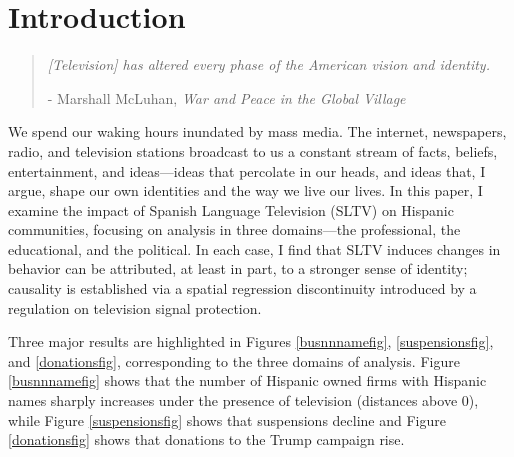 \documentclass[11pt]{article}
\begin{document}
\newsavebox{\tablebox} \newlength{\tableboxwidth}

\setlength{\baselineskip}{22pt}

\renewcommand{\thefootnote}{\fnsymbol{footnote}}


\thispagestyle{empty}

\newpage 
\renewcommand{\thefootnote}{\arabic{footnote}}

\pagebreak 
\setcounter{page}{0}


\onehalfspacing


\newpage

\setcounter{page}{1}
\section{Introduction}

\begin{quotation}
\textit{[Television] has altered every phase of the American vision and identity. }
\begin{flushright} - Marshall McLuhan, \textit{War and Peace in the Global Village}\end{flushright}
\end{quotation}

We spend our waking hours inundated by mass media. The internet, newspapers, radio, and television stations broadcast to us a constant stream of facts, beliefs, entertainment, and ideas---ideas that percolate in our heads, and ideas that, I argue, shape our own identities and the way we live our lives. In this paper, I examine the impact of Spanish Language Television (SLTV) on Hispanic communities, focusing on analysis in three domains---the professional, the educational, and the political. In each case, I find that SLTV induces changes in behavior can be attributed, at least in part, to a stronger sense of identity; causality is established via a spatial regression discontinuity introduced by a regulation on television signal protection.

 Three major results are highlighted in Figures \ref{busnnnamefig}, \ref{suspensionsfig}, and \ref{donationsfig}, corresponding to the three domains of analysis. Figure \ref{busnnnamefig} shows that the number of Hispanic owned firms with Hispanic names sharply increases under the presence of television (distances above $0$), while Figure \ref{suspensionsfig} shows that suspensions decline and Figure \ref{donationsfig} shows that donations to the Trump campaign rise.
\end{document}
